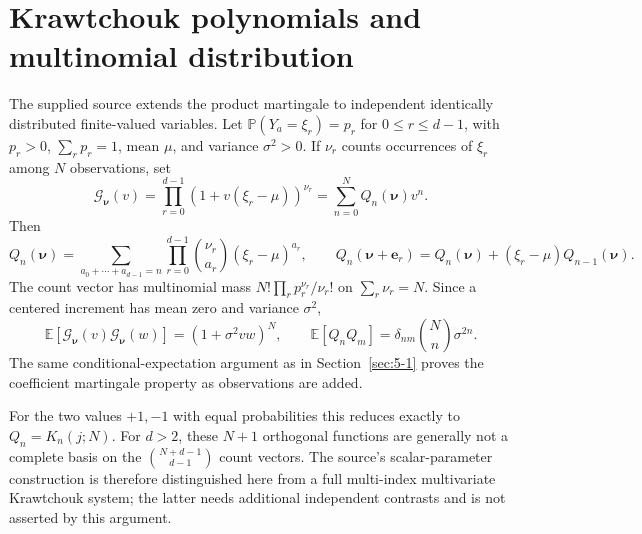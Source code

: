 \section{Krawtchouk polynomials and multinomial distribution}
\label{sec:5-3}
The supplied source extends the product martingale to independent identically distributed finite-valued variables. Let $\mathbb P(Y_a=\xi_r)=p_r$ for $0\le r\le d-1$, with $p_r>0$, $\sum_rp_r=1$, mean $\mu$, and variance $\sigma^2>0$. If $\nu_r$ counts occurrences of $\xi_r$ among $N$ observations, set
\[
\mathcal G_{\boldsymbol\nu}(v)=\prod_{r=0}^{d-1}(1+v(\xi_r-\mu))^{\nu_r}
=\sum_{n=0}^N Q_n(\boldsymbol\nu)v^n.
\]
Then
\[
Q_n(\boldsymbol\nu)=\sum_{a_0+\cdots+a_{d-1}=n}\prod_{r=0}^{d-1}\binom{\nu_r}{a_r}(\xi_r-\mu)^{a_r},
\qquad
Q_n(\boldsymbol\nu+\mathbf e_r)=Q_n(\boldsymbol\nu)+(\xi_r-\mu)Q_{n-1}(\boldsymbol\nu).
\]
The count vector has multinomial mass $N!\prod_r p_r^{\nu_r}/\nu_r!$ on $\sum_r\nu_r=N$. Since a centered increment has mean zero and variance $\sigma^2$,
\[
\mathbb E[\mathcal G_{\boldsymbol\nu}(v)\mathcal G_{\boldsymbol\nu}(w)]
=(1+\sigma^2vw)^N,\qquad
\mathbb E[Q_nQ_m]=\delta_{nm}\binom Nn\sigma^{2n}.
\]
The same conditional-expectation argument as in Section~\ref{sec:5-1} proves the coefficient martingale property as observations are added.

For the two values $+1,-1$ with equal probabilities this reduces exactly to $Q_n=K_n(j;N)$. For $d>2$, these $N+1$ orthogonal functions are generally not a complete basis on the $\binom{N+d-1}{d-1}$ count vectors. The source's scalar-parameter construction is therefore distinguished here from a full multi-index multivariate Krawtchouk system; the latter needs additional independent contrasts and is not asserted by this argument.

